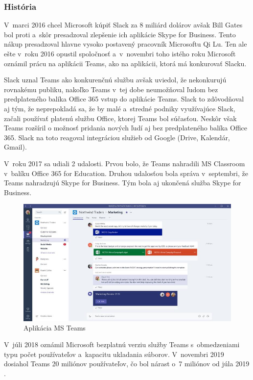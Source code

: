 \subsubsection{História}
\indent V marci 2016 chcel Microsoft kúpiť Slack za 8 miliárd dolárov avšak Bill Gates bol proti a skôr presadzoval zlepšenie ich aplikácie Skype for Business. Tento nákup presadzoval hlavne vysoko postavený pracovník Microsoftu Qi Lu. Ten ale ešte v roku 2016 opustil spoločnosť a v novembri toho istého roku Microsoft oznámil prácu na aplikácii Teams, ako na aplikácii, ktorá má konkurovať Slacku. 

\indent Slack uznal Teams ako konkurenčnú službu avšak uviedol, že nekonkurujú rovnakému publiku, nakoľko Teams v tej dobe neumožňoval ľudom bez predplateného balíka Office 365 vstup do aplikácie Teams. Slack to zdôvodňoval aj tým, že neprepokladá sa, že by malé a stredné podniky využívajúce Slack, začali používať platenú službu Office, ktorej Teams bol súčasťou. Neskôr však Teams rozšíril o možnosť pridania nových ľudí aj bez predplateného balíka Office 365. Slack na toto reagoval integráciou služieb od Google (Drive, Kalendár, Gmail). 

\indent V roku 2017 sa udiali 2 udalosti. Prvou bolo, že Teams nahradili MS Classroom v balíku Office 365 for Education. Druhou udalosťou bola správa v septembri, že Teams nahradzujú Skype for Business. Tým bola aj ukončená služba Skype for Business. 

\begin{figure}[H]
    \centering
    \includegraphics[scale=0.70]{img/obr-ms-teams.jpg}
    \caption{Aplikácia MS Teams \cite{ms_teams_2}}
    \label{fig:img-ms-teams}
\end{figure}

\indent V júli 2018 oznámil Microsoft bezplatnú verziu služby Teams s obmedzeniami typu počet používateľov a kapacitu ukladania súborov. V novembri 2019 dosiahol Teams 20 miliónov používateľov, čo bol nárast o 7 miliónov od júla 2019 \cite{ms_teams}. 
